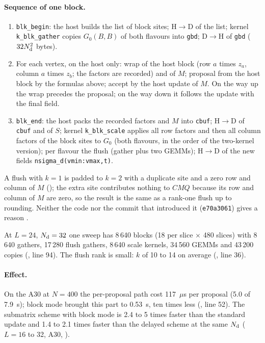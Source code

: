 \paragraph{Sequence of one block.}
\begin{enumerate}
\item \texttt{blk\_begin}: the host builds the list of block sites; H$\to$D of the list; kernel \texttt{k\_blk\_gather} copies $G_0(B,B)$ of both flavours into \texttt{gbd}; D$\to$H of \texttt{gbd} ($32N_{\rm d}^2$ bytes).
\item For each vertex, on the host only: wrap of the host block (row $a$ times $z_a$, column $a$ times $z_b$; the factors are recorded) and of $M$; proposal from the host block by the formulas above; accept by the host update of $M$. On the way up the wrap precedes the proposal; on the way down it follows the update with the final field.
\item \texttt{blk\_end}: the host packs the recorded factors and $M$ into \texttt{cbuf}; H$\to$D of \texttt{cbuf} and of $S$; kernel \texttt{k\_blk\_scale} applies all row factors and then all column factors of the block sites to $G_0$ (both flavours, in the order of the two-kernel version); per flavour the flush (gather plus two GEMMs); H$\to$D of the new fields \texttt{nsigma\_d(vmin:vmax,t)}.
\end{enumerate}
A flush with $k=1$ is padded to $k=2$ with a duplicate site and a zero row and column of $M$ (); the extra site contributes nothing to $CMQ$ because its row and column of $M$ are zero, so the result is the same as a rank-one flush up to rounding. Neither the code nor the commit that introduced it (\texttt{e70a3061}) gives a reason .

At $L=24$, $N_{\rm d}=32$ one sweep has 8\,640 blocks (18 per slice $\times$ 480 slices) with 8\,640 gathers, 17\,280 flush gathers, 8\,640 scale kernels, 34\,560 GEMMs and 43\,200 copies (, line 94). %
The flush rank is small: $k$ of 10 to 14 on average (, line 36). %

\paragraph{Effect.} On the A30 at $N=400$ the per-proposal path cost 117~$\mu$s per proposal (5.0 of 7.9~s); block mode brought this part to 0.53~s, ten times less (, line 52). %
The submatrix scheme with block mode is 2.4 to 5 times faster than the standard update and 1.4 to 2.1 times faster than the delayed scheme at the same $N_{\rm d}$ ($L=16$ to 32, A30, ). %

